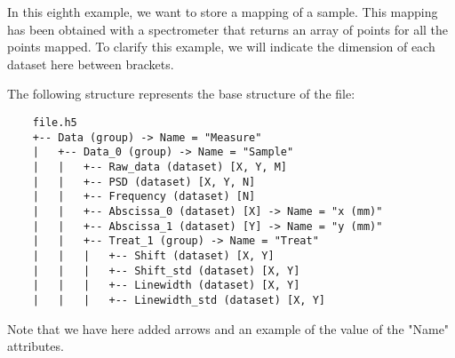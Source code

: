 In this eighth example, we want to store a mapping of a sample. This mapping has been obtained with a spectrometer that returns an array of points for all the points mapped. To clarify this example, we will indicate the dimension of each dataset here between brackets.

The following structure represents the base structure of the file:
\begin{verbatim}
    file.h5
    +-- Data (group) -> Name = "Measure"
    |   +-- Data_0 (group) -> Name = "Sample"
    |   |   +-- Raw_data (dataset) [X, Y, M]
    |   |   +-- PSD (dataset) [X, Y, N]
    |   |   +-- Frequency (dataset) [N]
    |   |   +-- Abscissa_0 (dataset) [X] -> Name = "x (mm)"
    |   |   +-- Abscissa_1 (dataset) [Y] -> Name = "y (mm)"
    |   |   +-- Treat_1 (group) -> Name = "Treat"
    |   |   |   +-- Shift (dataset) [X, Y]
    |   |   |   +-- Shift_std (dataset) [X, Y]
    |   |   |   +-- Linewidth (dataset) [X, Y]
    |   |   |   +-- Linewidth_std (dataset) [X, Y]
\end{verbatim}
Note that we have here added arrows and an example of the value of the "Name" attributes.
